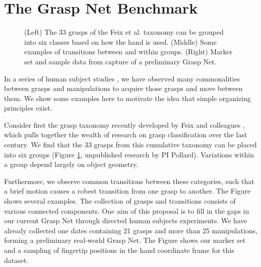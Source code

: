 \section{The Grasp Net Benchmark}   

\begin{figure}
\begin{center}
\vspace*{2in}
\end{center}
\caption[]{(Left) The 33 grasps of the Feix et al. taxonomy can be grouped into six classes based on how the hand is used. (Middle) Some examples of transitions between and within groups.  (Right) Marker set and sample data from capture of a preliminary Grasp Net.}
\label{GraspNet}
\end{figure}


In a series of human subject studies \cite{Liu2014, JiaDatabase, Chang:2009:RSSWorkshop, Chang:2014, liu2016annotating}, we have observed many commonalities between grasps and manipulations to acquire those grasps and move between them.   We show some examples here to motivate the idea that simple organizing principles exist.

Consider first the grasp taxonomy recently developed by Feix and colleagues \cite{feixgrasp}, which pulls together the wealth of research on grasp classification over the last century.   We find that the 33 grasps from this cumulative taxonomy can be placed into six groups (Figure \ref{GraspNet}, unpublished research by PI Pollard).  Variations within a group depend largely on object geometry.

Furthermore, we observe common transitions between these categories, such that a brief motion causes a robest transition from one grasp to another.   The Figure shows several examples.   The collection of grasps and transitions consists of various connected components.   One aim of this proposal is to fill in the gaps in our current Grasp Net through directed human subjects experiments.   We have already collected one dates containing 21 grasps and more than 25 manipulations, forming a preliminary real-world Grasp Net.   The Figure shows our marker set and a sampling of fingertip positions in the hand coordinate frame for this dataset.
